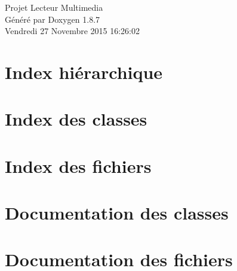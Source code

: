 \documentclass[twoside]{book}
\newcommand{\+}{\discretionary{\mbox{\scriptsize$\hookleftarrow$}}{}{}}
\newcommand{\clearemptydoublepage}{%
  \newpage{\pagestyle{empty}\cleardoublepage}%
}
\begin{document}
\hypersetup{pageanchor=false,
             bookmarks=true,
             bookmarksnumbered=true,
             pdfencoding=unicode
            }
\begin{titlepage}
\vspace*{7cm}
\begin{center}%
{\Large Projet Lecteur Multimedia }\\
\vspace*{1cm}
{\large Généré par Doxygen 1.8.7}\\
\vspace*{0.5cm}
{\small Vendredi 27 Novembre 2015 16:26:02}\\
\end{center}
\end{titlepage}
\clearemptydoublepage
\tableofcontents
\clearemptydoublepage
{}
\hypersetup{pageanchor=true}

\chapter{Index hiérarchique}

\chapter{Index des classes}

\chapter{Index des fichiers}

\chapter{Documentation des classes}



























\chapter{Documentation des fichiers}
























\newpage
{}
{}
\printindex
\end{document}

